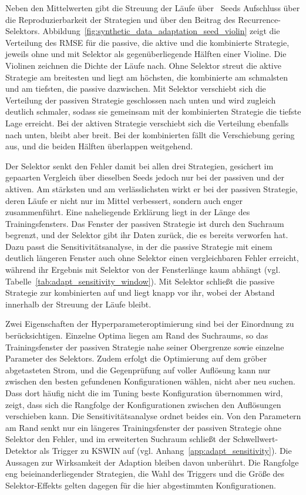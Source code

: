 Neben den Mittelwerten gibt die Streuung der Läufe über \adaptNSeeds\ Seeds Aufschluss über die Reproduzierbarkeit der Strategien und über den Beitrag des Recurrence-Selektors. Abbildung~\ref{fig:synthetic_data_adaptation_seed_violin} zeigt die Verteilung des \ac{RMSE} für die passive, die aktive und die kombinierte Strategie, jeweils ohne und mit Selektor als gegenüberliegende Hälften einer Violine. Die Violinen zeichnen die Dichte der Läufe nach. Ohne Selektor streut die aktive Strategie am breitesten und liegt am höchsten, die kombinierte am schmalsten und am tiefsten, die passive dazwischen. Mit Selektor verschiebt sich die Verteilung der passiven Strategie geschlossen nach unten und wird zugleich deutlich schmaler, sodass sie gemeinsam mit der kombinierten Strategie die tiefste Lage erreicht. Bei der aktiven Strategie verschiebt sich die Verteilung ebenfalls nach unten, bleibt aber breit. Bei der kombinierten fällt die Verschiebung gering aus, und die beiden Hälften überlappen weitgehend. \par
%
Der Selektor senkt den Fehler damit bei allen drei Strategien, gesichert im gepaarten Vergleich über dieselben Seeds jedoch nur bei der passiven und der aktiven. Am stärksten und am verlässlichsten wirkt er bei der passiven Strategie, deren Läufe er nicht nur im Mittel verbessert, sondern auch enger zusammenführt. Eine naheliegende Erklärung liegt in der Länge des Trainingsfensters. Das Fenster der passiven Strategie ist durch den Suchraum begrenzt, und der Selektor gibt ihr Daten zurück, die es bereits verworfen hat. Dazu passt die Sensitivitätsanalyse, in der die passive Strategie mit einem deutlich längeren Fenster auch ohne Selektor einen vergleichbaren Fehler erreicht, während ihr Ergebnis mit Selektor von der Fensterlänge kaum abhängt (vgl. Tabelle~\ref{tab:adapt_sensitivity_window}). Mit Selektor schließt die passive Strategie zur kombinierten auf und liegt knapp vor ihr, wobei der Abstand innerhalb der Streuung der Läufe bleibt. \par
%
Zwei Eigenschaften der Hyperparameteroptimierung sind bei der Einordnung zu berücksichtigen. Einzelne Optima liegen am Rand des Suchraums, so das Trainingsfenster der passiven Strategie nahe seiner Obergrenze sowie einzelne Parameter des Selektors. Zudem erfolgt die Optimierung auf dem gröber abgetasteten Strom, und die Gegenprüfung auf voller Auflösung kann nur zwischen den besten gefundenen Konfigurationen wählen, nicht aber neu suchen. Dass dort häufig nicht die im Tuning beste Konfiguration übernommen wird, zeigt, dass sich die Rangfolge der Konfigurationen zwischen den Auflösungen verschieben kann. Die Sensitivitätsanalyse ordnet beides ein. Von den Parametern am Rand senkt nur ein längeres Trainingsfenster der passiven Strategie ohne Selektor den Fehler, und im erweiterten Suchraum schließt der Schwellwert-Detektor als Trigger zu \ac{KSWIN} auf (vgl. Anhang~\ref{app:adapt_sensitivity}). Die Aussagen zur Wirksamkeit der Adaption bleiben davon unberührt. Die Rangfolge eng beieinanderliegender Strategien, die Wahl des Triggers und die Größe des Selektor-Effekts gelten dagegen für die hier abgestimmten Konfigurationen. \par

